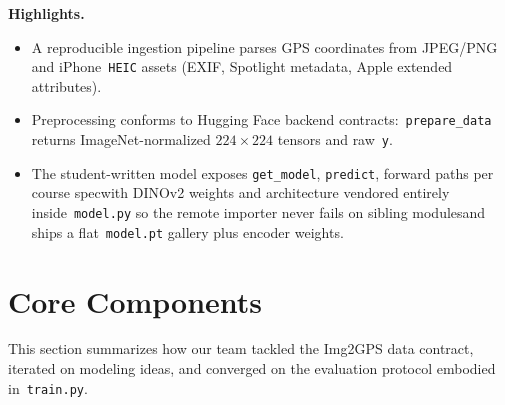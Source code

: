 \documentclass[10pt]{article}
\begin{document}
\textbf{Highlights.}
\begin{itemize}
    \item A reproducible ingestion pipeline parses GPS coordinates from JPEG/PNG and iPhone~\texttt{HEIC} assets (EXIF, Spotlight metadata, Apple extended attributes).
    \item Preprocessing conforms to Hugging Face backend contracts:~\texttt{prepare\_data} returns ImageNet-normalized $224{\times}224$ tensors and raw~\texttt{y}.
    \item The student-written model exposes \texttt{get\_model}, \texttt{predict}, forward paths per course spec\textemdash with DINOv2 weights and architecture vendored entirely inside~\texttt{model.py} so the remote importer never fails on sibling modules\textemdash and ships a flat~\texttt{model.pt} gallery plus encoder weights.
\end{itemize}

\section{Core Components}

This section summarizes how our team tackled the Img2GPS data contract, iterated on modeling ideas, and converged on the evaluation protocol embodied in~\texttt{train.py}.
\end{document}
